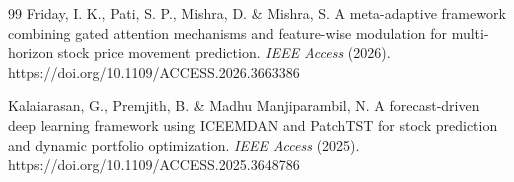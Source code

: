 \documentclass[fleqn,10pt]{wlscirep}
\begin{document}
\begin{thebibliography}{99}
Friday, I. K., Pati, S. P., Mishra, D. \& Mishra, S. A meta-adaptive framework combining gated attention mechanisms and feature-wise modulation for multi-horizon stock price movement prediction. \textit{IEEE Access} (2026). https://doi.org/10.1109/ACCESS.2026.3663386

Kalaiarasan, G., Premjith, B. \& Madhu Manjiparambil, N. A forecast-driven deep learning framework using ICEEMDAN and PatchTST for stock prediction and dynamic portfolio optimization. \textit{IEEE Access} (2025). https://doi.org/10.1109/ACCESS.2025.3648786

\end{thebibliography}
\end{document}
